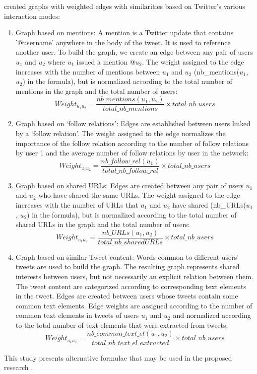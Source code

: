  created graphs with weighted edges with similarities based on Twitter's various interaction modes:
\begin {enumerate}
\item Graph based on mentions: A mention is a Twitter update that contains '@username' anywhere in the body of the tweet. It is used to reference another user. To build the graph, we create an edge between any pair of users $u_1$ and $u_2$ where $u_1$ issued a mention @$u_2$. The weight assigned to the edge increases with the number of mentions between $u_1$ and $u_2$ (nb\_mentions($u_1$, $u_2$) in the formula), but is normalized according to the total number of mentions in the graph and the total number of users:
\begin{equation}
	Weight_{u_1 u_2} = \frac{nb\_mentions(u_1, u_2)}{total\_nb\_mentions} \times total\_nb\_users
\end{equation}
\item Graph based on ‘follow relations’: Edges are established between users linked by a ‘follow relation’. The weight assigned to the edge normalizes the importance of the follow relation according to the number of follow relations by user 1 and the average number of follow relations by user in the network:
\begin{equation}
	Weight_{u_1 u_2} = \frac{nb\_follow\_rel(u_1)}{total\_nb\_follow\_rel} \times total\_nb\_users
\end{equation}
\item Graph based on shared URLs: Edges are created between any pair of users $u_1$ and $u_2$ who have shared the same URLs. The weight assigned to the edge increases with the number of URLs that $u_1$ and $u_2$ have shared (nb\_URLs($u_1$, $u_2$) in the formula), but is normalized according to the total number of shared URLs in the graph and the total number of users:
\begin{equation}
	Weight_{u_1 u_2} = \frac{nb\_URLs(u_1, u_2)}{total\_nb\_sharedURLs} \times total\_nb\_users
\end{equation}
\item Graph based on similar Tweet content: Words common to different users’ tweets are used to build the graph. The resulting graph represents shared interests between users, but not necessarily an explicit relation between them. The tweet content are categorized according to corresponding text elements in the tweet. Edges are created between users whose tweets contain some common text elements. Edge weights are assigned according to the number of common text elements in tweets of users $u_1$ and $u_2$ and normalized according to the total number of text elements that were extracted from tweets:
\begin{equation}
	Weight_{u_1 u_2} = \frac{nb\_common\_text\_el(u_1, u_2)}{total\_nb\_text\_el\_extracted} \times total\_nb\_users
\end{equation}

\end {enumerate}
This study presents alternative formulae that may be used in the proposed research \cite{Bakillah:2014}.

